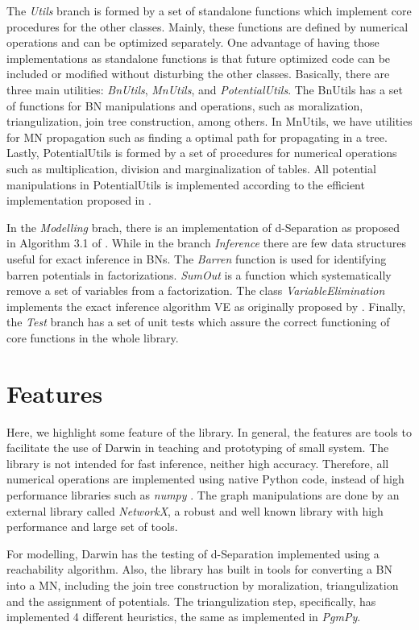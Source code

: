 The \emph{Utils} branch is formed by a set of standalone functions which implement core procedures for the other classes.
Mainly, these functions are defined by numerical operations and can be optimized separately.
One advantage of having those implementations as standalone functions is that future optimized code can be included or modified without disturbing the other classes.
Basically, there are three main utilities: \emph{BnUtils}, \emph{MnUtils}, and \emph{PotentialUtils}.
The BnUtils has a set of functions for BN manipulations and operations, such as moralization, triangulization, join tree construction, among others.
In MnUtils, we have utilities for MN propagation such as finding a optimal path for propagating in a tree.
Lastly, PotentialUtils is formed by a set of procedures for numerical operations such as multiplication, division and marginalization of tables.
All potential manipulations in PotentialUtils is implemented according to the efficient implementation proposed in \cite{koll09}.

In the \emph{Modelling} brach, there is an implementation of d-Separation as proposed in Algorithm 3.1 of \cite{koll09}.
While in the branch \emph{Inference} there are few data structures useful for exact inference in BNs.
The \emph{Barren} function is used for identifying barren potentials in factorizations.
\emph{SumOut} is a function which systematically remove a set of variables from a factorization.
The class \emph{VariableElimination} implements the exact inference algorithm VE as originally proposed by \cite{zhan94}.
Finally, the \emph{Test} branch has a set of unit tests which assure the correct functioning of core functions in the whole library.

\section{Features}
\label{sec:system:sec2}

Here, we highlight some feature of the library.
In general, the features are tools to facilitate the use of Darwin in teaching and prototyping of small system.
The library is not intended for fast inference, neither high accuracy.
Therefore, all numerical operations are implemented using native Python code, instead of high performance libraries such as \emph{numpy} \cite{van2011numpy}.
The graph manipulations are done by an external library called \emph{NetworkX}, a robust and well known library with high performance and large set of tools.

For modelling, Darwin has the testing of d-Separation implemented using a reachability algorithm.
Also, the library has built in tools for converting a BN into a MN, including the join tree construction by moralization, triangulization and the assignment of potentials.
The triangulization step, specifically, has implemented 4 different heuristics, the same as implemented in \emph{PgmPy}.

